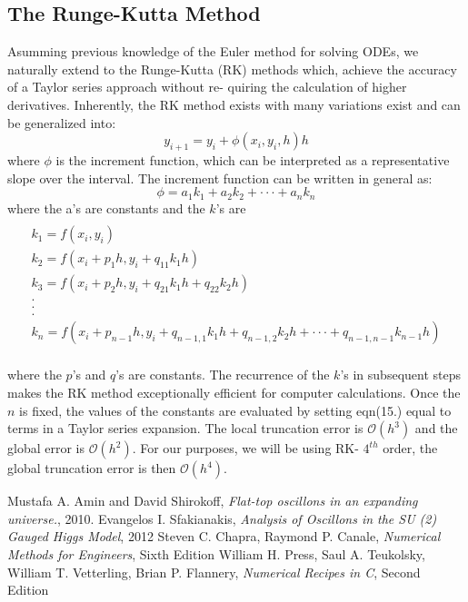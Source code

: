 \documentclass{article}
\begin{document}
\subsection{The Runge-Kutta Method}
Asumming previous knowledge of the Euler method for solving ODEs, we naturally extend to the 
Runge-Kutta (RK) methods which, achieve the accuracy of a Taylor series approach without re-
quiring the calculation of higher derivatives. Inherently, the RK method exists with many variations exist and can be generalized into:
\begin{equation}
y_{i+1} = y_{i} + \phi(x_{i}, y_{i}, h)h
\end{equation}
where $\phi$ is the increment function, which can be interpreted as a representative slope over the interval. The increment function can be written in general as:
$$
\phi = a_{1}k_{1} + a_{2}k_{2} + · · · + a_{n}k_{n}
$$
where the a’s are constants and the $k$’s are
\begin{multline}
\\
k_{1} = f(x_{i}, y_{i}) \\ 
k_{2} = f(x_{i} + p_{1}h, y_{i} + q_{11}k_{1}h) \\
k_{3} = f(x_{i} + p_{2}h, y_{i} + q_{21}k_{1} h + q_{22}k_{2}h) \\
. \\
. \\
. \\
k_{n} = f(x_{i} + p_{n−1}h, y_{i} + q_{n−1,1}k_{1}h + q_{n−1,2}k_{2}h + · · · + q_{n−1,n−1}k_{n−1}h) \\
\end{multline}

where the $p$’s and $q$’s are constants. The recurrence of the $k$'s in subsequent steps makes the RK method exceptionally efficient for computer calculations. Once the $n$ is fixed, the values of the constants are evaluated by setting eqn(15.) equal to terms in a Taylor series expansion. The local truncation error is $\mathcal{O}(h^{3})$ and the global error is $\mathcal{O}(h^{2})$. For our purposes, we will be using RK- $4^{th}$ order, the global truncation error is then $\mathcal{O}(h^{4})$.
\begin{thebibliography}{1}
 Mustafa A. Amin and David Shirokoff, {\em Flat-top oscillons in an expanding universe.}, 2010.
 Evangelos I. Sfakianakis, {\em Analysis of Oscillons in the SU (2) Gauged Higgs Model}, 2012
Steven C. Chapra, Raymond P. Canale, {\em Numerical Methods for Engineers}, Sixth Edition
William H. Press, Saul A. Teukolsky, William T. Vetterling, Brian P. Flannery, {\em Numerical Recipes in C}, Second Edition
\end{thebibliography}
\end{document}

